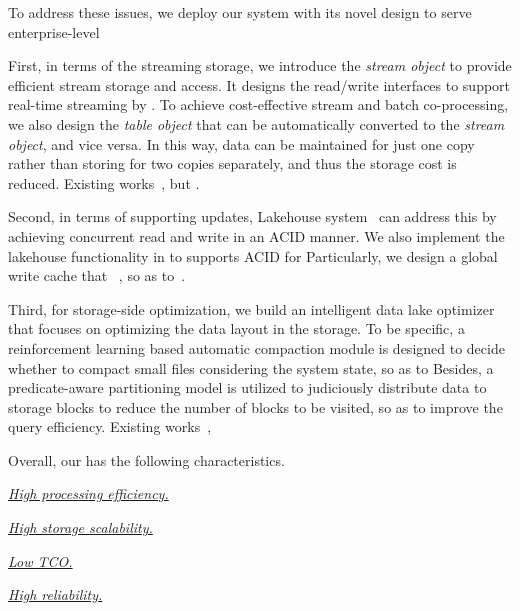To address these issues, we deploy our \sys system with its novel design to serve enterprise-level  


First, in terms of the streaming storage,
 we introduce the \textit{stream object}  to provide efficient stream storage and access. It designs the read/write interfaces to support real-time streaming by . 
To achieve cost-effective stream and batch co-processing, we also design the \textit{table object} that can be automatically converted  to the \textit{stream object}, and vice versa. In this way, data can be maintained for just one copy rather than storing for two copies separately, and thus the storage cost is reduced. 
Existing works~\cc{\cite{}}, but .




Second, in terms of supporting updates, Lakehouse system~\cite{} can address this by achieving concurrent read and write in an ACID manner. We also implement the lakehouse functionality in \sys to supports ACID for  Particularly, we design a global write cache that ~, so as to~.

Third, for storage-side optimization, we build an intelligent data lake optimizer \brain that focuses on optimizing the data layout in the storage.%
 To be specific, a reinforcement learning based automatic compaction module is designed to decide whether to compact small files considering the system state, so as to  Besides, a predicate-aware partitioning model is utilized to judiciously distribute data to storage blocks to reduce the number of blocks to be visited, so as to improve the query efficiency.  Existing works~\cc{\cite{}},

Overall, our \sys has the following characteristics.


\noindent \underline{\textit{High processing efficiency.}} 


\noindent \underline{\textit{High storage scalability.}}


\noindent \underline{\textit{Low TCO.}} 


\noindent \underline{\textit{High reliability.}}

